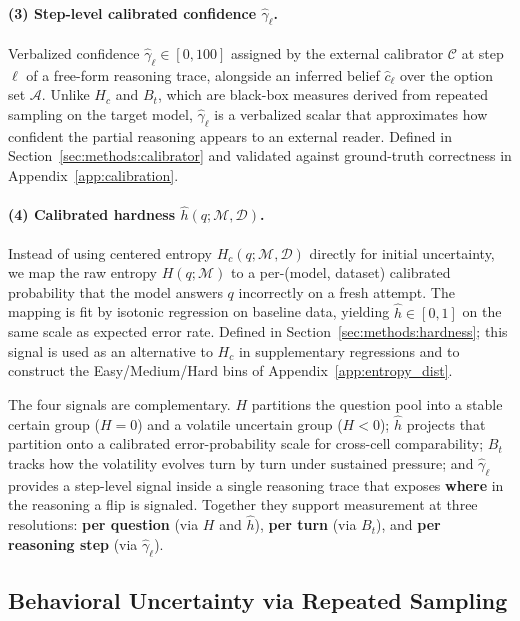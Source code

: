 \paragraph{(3) Step-level calibrated confidence $\hat{\gamma}_\ell$.}
Verbalized confidence $\hat{\gamma}_\ell \in [0, 100]$ assigned by the external calibrator $\mathcal{C}$ at step $\ell$ of a free-form reasoning trace, alongside an inferred belief $\hat{c}_\ell$ over the option set $\mathcal{A}$. Unlike $H_c$ and $B_t$, which are black-box measures derived from repeated sampling on the target model, $\hat{\gamma}_\ell$ is a verbalized scalar that approximates how confident the partial reasoning appears to an external reader. Defined in Section~\ref{sec:methods:calibrator} and validated against ground-truth correctness in Appendix~\ref{app:calibration}.

\paragraph{(4) Calibrated hardness $\hat{h}(q;\mathcal{M},\mathcal{D})$.} Instead of using centered entropy $H_c(q;\mathcal{M},\mathcal{D})$ directly for initial uncertainty, we map the raw entropy $H(q;\mathcal{M})$ to a per-(model, dataset) calibrated probability that the model answers $q$ incorrectly on a fresh attempt. The mapping is fit by isotonic regression on baseline data, yielding $\hat{h} \in [0, 1]$ on the same scale as expected error rate. Defined in Section~\ref{sec:methods:hardness}; this signal is used as an alternative to $H_c$ in supplementary regressions and to construct the Easy/Medium/Hard bins of Appendix~\ref{app:entropy_dist}.

The four signals are complementary. $H$ partitions the question pool into a stable certain group ($H = 0$) and a volatile uncertain group ($H < 0$); $\hat{h}$ projects that partition onto a calibrated error-probability scale for cross-cell comparability; $B_t$ tracks how the volatility evolves turn by turn under sustained pressure; and $\hat{\gamma}_\ell$ provides a step-level signal inside a single reasoning trace that exposes \textbf{where} in the reasoning a flip is signaled. Together they support measurement at three resolutions: \textbf{per question} (via $H$ and $\hat{h}$), \textbf{per turn} (via $B_t$), and \textbf{per reasoning step} (via $\hat{\gamma}_\ell$).

\subsection{Behavioral Uncertainty via Repeated Sampling}
\label{sec:methods:entropy}

